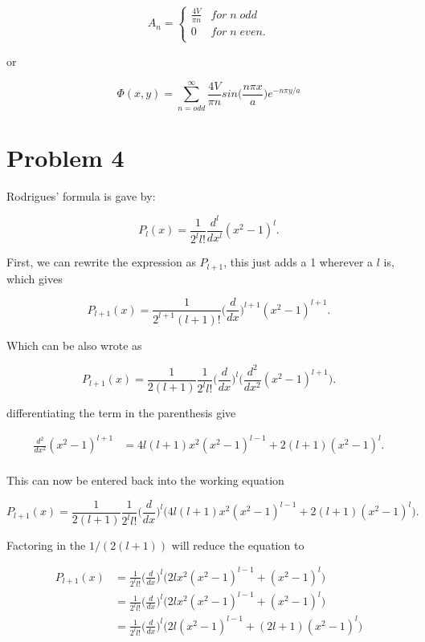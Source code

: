 \documentclass[11pt]{article}
\begin{document}
\[ A_{n} = \begin{cases} 
       \frac{4V}{\pi n} & for \; n \; odd \\
      0 & for \; n \; even. \\
   \end{cases}
\]

or

$$
\Phi(x, y) = \sum_{n = odd}^{\infty} \frac{4V}{\pi n}sin\Big(\frac{n\pi x}{a}\Big) e^{-n\pi y/a}
$$

\clearpage

\section*{Problem 4}

Rodrigues' formula is gave by:

$$
P_{l}(x) = \frac{1}{2^{l}l!}\frac{d^{l}}{dx^{l}}(x^{2} - 1)^{l}.
$$

First, we can rewrite the expression as $P_{l+1}$, this just adds a 1 wherever a $l$ is, which gives

$$
P_{l+1}(x) = \frac{1}{2^{l+1}(l+1)!}\Big(\frac{d}{dx}\Big)^{l+1}(x^{2} - 1)^{l+1}.
$$

Which can be also wrote as

$$
P_{l+1}(x) = \frac{1}{2(l+1)}\frac{1}{2^{l}l!}\Big(\frac{d}{dx}\Big)^{l}\Big(\frac{d^{2}}{dx^{2}}(x^{2} - 1)^{l+1}\Big).
$$

differentiating the term in the parenthesis give

\begin{align*}
\frac{d^{2}}{dx^{2}}(x^{2} - 1)^{l+1} &= 4l(l+1)x^{2}(x^{2} - 1)^{l-1}+2(l+1)(x^{2} - 1)^{l}. \\
\end{align*}

This can now be entered back into the working equation

$$
P_{l+1}(x) = \frac{1}{2(l+1)}\frac{1}{2^{l}l!}\Big(\frac{d}{dx}\Big)^{l}\Big(4l(l+1)x^{2}(x^{2} - 1)^{l-1}+2(l+1)(x^{2} - 1)^{l}\Big).
$$

Factoring in the $1/(2(l+1))$ will reduce the equation to 

\begin{align*}
P_{l+1}(x) &= \frac{1}{2^{l}l!}\Big(\frac{d}{dx}\Big)^{l}\Big(2lx^{2}(x^{2} - 1)^{l-1}+(x^{2} - 1)^{l}\Big) \\
 &= \frac{1}{2^{l}l!}\Big(\frac{d}{dx}\Big)^{l}\Big(2lx^{2}(x^{2} - 1)^{l-1}+(x^{2} - 1)^{l}\Big) \\
 &= \frac{1}{2^{l}l!}\Big(\frac{d}{dx}\Big)^{l}\Big(2l(x^{2} - 1)^{l-1}+(2l+1)(x^{2} - 1)^{l}\Big)
\end{align*}
\end{document}
